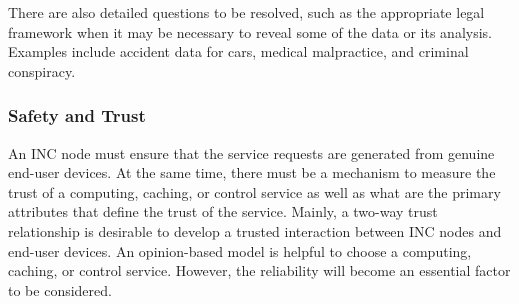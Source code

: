 %
There are also detailed questions to be resolved, such as the appropriate legal framework when it may be necessary to reveal some of the data or its analysis. Examples include accident data for cars, medical malpractice, and criminal conspiracy.

\subsubsection{Safety and Trust}
An INC node must ensure that the service requests are generated from genuine end-user devices. At the same time, there must be a mechanism to measure the trust of a computing, caching, or control service as well as what are the primary attributes that define the trust of the service. Mainly, a two-way trust relationship is desirable to develop a trusted interaction between INC nodes and end-user devices. An opinion-based model is helpful to choose a computing, caching, or control service. However, the reliability will become an essential factor to be considered. 


